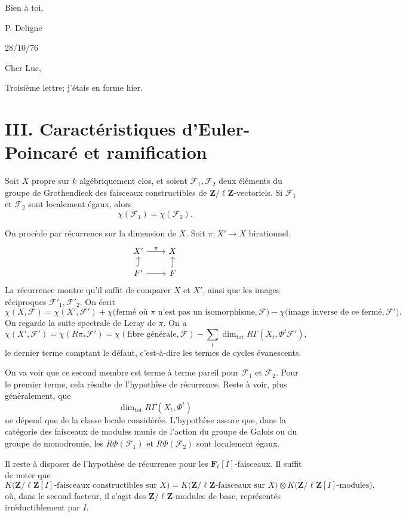 \documentclass[11pt]{article}
\newcommand{\F}{\mathcal F}
\newcommand{\Zell}{\mathbf Z/\ell\mathbf Z}
\newcommand{\Fell}{\mathbf F_\ell}
\DeclareMathOperator{\Tot}{tot}
\begin{document}
Bien à toi,

\hspace{2em}P. Deligne

\newpage

\begin{flushright}
28/10/76
\end{flushright}

Cher Luc,

Troisième lettre; j'étais en forme hier.

\section*{III. Caractéristiques d'Euler-Poincaré et ramification}

Soit \(X\) propre sur \(k\) algébriquement clos, et soient \(\F_1,\F_2\) deux éléments du groupe de Grothendieck des faisceaux constructibles de \(\Zell\)-vectoriels. Si \(\F_1\) et \(\F_2\) sont localement égaux, alors
\[
  \chi(\F_1)=\chi(\F_2).
\]

On procède par récurrence sur la dimension de \(X\). Soit \(\pi:X'\to X\) birationnel.
\[
\begin{tikzcd}[column sep=2.2em,row sep=1.2em]
X' \arrow[r,"\pi"] & X \\
F' \arrow[u,hook] \arrow[r] & F \arrow[u,hook]
\end{tikzcd}
\] La récurrence montre qu'il suffit de comparer \(X\) et \(X'\), ainsi que les images réciproques \(\F'_1,\F'_2\). On écrit
\[
  \chi(X,\F)=\chi(X',\F')+
  \chi\bigl(\text{fermé où }\pi\text{ n'est pas un isomorphisme},\F\bigr)
  -\chi\bigl(\text{image inverse de ce fermé},\F'\bigr).
\]
On regarde la suite spectrale de Leray de \(\pi\). On a
\[
  \chi(X',\F')
  =\chi(R\pi_*\F')
  =\chi(\text{fibre générale},\F)
   -\sum_t \dim_{\Tot}R\Gamma(X_t,\Phi^t\F'),
\]
le dernier terme comptant le défaut, c'est-à-dire les termes de cycles évanescents.

On va voir que ce second membre est terme à terme pareil pour \(\F_1\) et \(\F_2\). Pour le premier terme, cela résulte de l'hypothèse de récurrence. Reste à voir, plus généralement, que
\[
  \dim_{\Tot} R\Gamma(X_t,\Phi^t)
\tag{1}
\]
ne dépend que de la classe locale considérée. L'hypothèse assure que, dans la catégorie des faisceaux de modules munis de l'action du groupe de Galois ou du groupe de monodromie, les \(R\Phi(\F_1)\) et \(R\Phi(\F_2)\) sont localement égaux.

Il reste à disposer de l'hypothèse de récurrence pour les \(\Fell[I]\)-faisceaux. Il suffit de noter que
\[
K\bigl(\Zell[I]\text{-faisceaux constructibles sur }X\bigr)
=
K\bigl(\Zell\text{-faisceaux sur }X\bigr)
\otimes
K\bigl(\Zell[I]\text{-modules}\bigr),
\]
où, dans le second facteur, il s'agit des \(\Zell\)-modules de base, représentés irréductiblement par \(I\).
\end{document}
